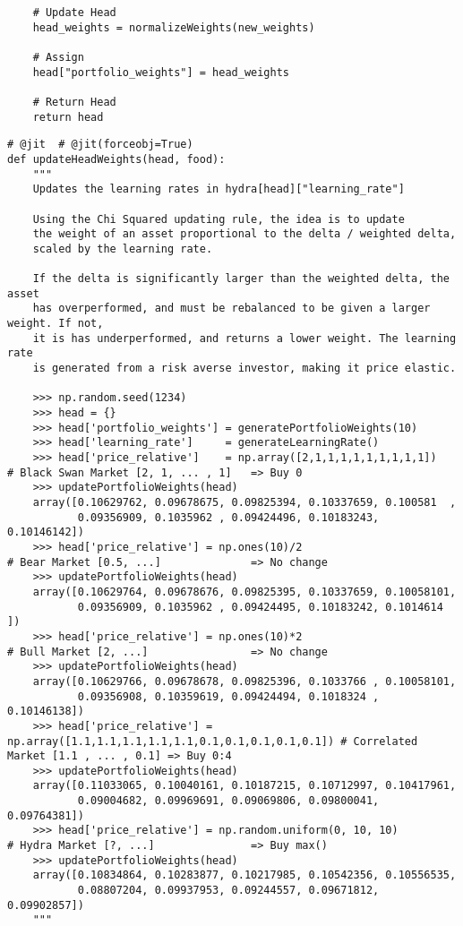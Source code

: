 \documentclass[11pt, a4paper]{awesome-cv}
\begin{document}
\begin{cvletter}
\begin{verbatim}
    # Update Head
    head_weights = normalizeWeights(new_weights)

    # Assign
    head["portfolio_weights"] = head_weights

    # Return Head
    return head
\end{verbatim}

\begin{verbatim}
# @jit  # @jit(forceobj=True)
def updateHeadWeights(head, food):
    """
    Updates the learning rates in hydra[head]["learning_rate"]

    Using the Chi Squared updating rule, the idea is to update
    the weight of an asset proportional to the delta / weighted delta,
    scaled by the learning rate.

    If the delta is significantly larger than the weighted delta, the asset
    has overperformed, and must be rebalanced to be given a larger weight. If not,
    it is has underperformed, and returns a lower weight. The learning rate
    is generated from a risk averse investor, making it price elastic.

    >>> np.random.seed(1234)
    >>> head = {}
    >>> head['portfolio_weights'] = generatePortfolioWeights(10)
    >>> head['learning_rate']     = generateLearningRate()
    >>> head['price_relative']    = np.array([2,1,1,1,1,1,1,1,1,1])                  # Black Swan Market [2, 1, ... , 1]   => Buy 0
    >>> updatePortfolioWeights(head)
    array([0.10629762, 0.09678675, 0.09825394, 0.10337659, 0.100581  ,
           0.09356909, 0.1035962 , 0.09424496, 0.10183243, 0.10146142])
    >>> head['price_relative'] = np.ones(10)/2                                       # Bear Market [0.5, ...]              => No change
    >>> updatePortfolioWeights(head)
    array([0.10629764, 0.09678676, 0.09825395, 0.10337659, 0.10058101,
           0.09356909, 0.1035962 , 0.09424495, 0.10183242, 0.1014614 ])
    >>> head['price_relative'] = np.ones(10)*2                                       # Bull Market [2, ...]                => No change
    >>> updatePortfolioWeights(head)
    array([0.10629766, 0.09678678, 0.09825396, 0.1033766 , 0.10058101,
           0.09356908, 0.10359619, 0.09424494, 0.1018324 , 0.10146138])
    >>> head['price_relative'] = np.array([1.1,1.1,1.1,1.1,1.1,0.1,0.1,0.1,0.1,0.1]) # Correlated Market [1.1 , ... , 0.1] => Buy 0:4
    >>> updatePortfolioWeights(head)
    array([0.11033065, 0.10040161, 0.10187215, 0.10712997, 0.10417961,
           0.09004682, 0.09969691, 0.09069806, 0.09800041, 0.09764381])
    >>> head['price_relative'] = np.random.uniform(0, 10, 10)                        # Hydra Market [?, ...]               => Buy max()
    >>> updatePortfolioWeights(head)
    array([0.10834864, 0.10283877, 0.10217985, 0.10542356, 0.10556535,
           0.08807204, 0.09937953, 0.09244557, 0.09671812, 0.09902857])
    """


\end{verbatim}
\end{cvletter}
\end{document}
